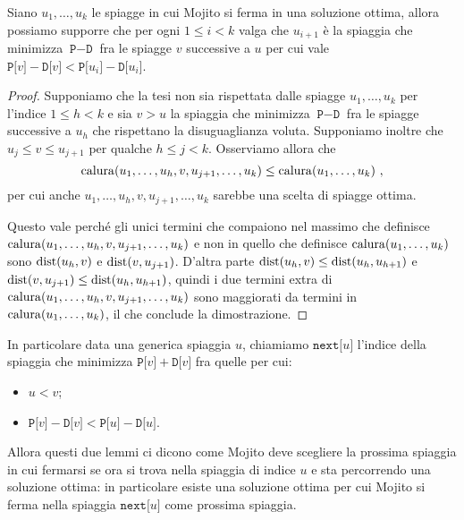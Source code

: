 \begin{lemma}
	Siano $u_1,\ldots,u_k$ le spiagge in cui Mojito si ferma in una soluzione ottima, allora possiamo supporre che per ogni $1\le i <k$ valga che $u_{i+1}$ è la spiaggia che minimizza $\texttt{P}-\texttt{D}$ fra le spiagge $v$ successive a $u$ per cui vale $\texttt{P[}v \texttt{]} - \texttt{D[}v\texttt{]} < \texttt{P[}u_i \texttt{]} - \texttt{D[}u_i\texttt{]}$.
\end{lemma}
\begin{small}
\begin{proof}
	Supponiamo che la tesi non sia rispettata dalle spiagge $u_1,\ldots,u_k$ per l'indice $1 \le h < k$ e sia $v>u$ la spiaggia che minimizza $\texttt{P}-\texttt{D}$ fra le spiagge successive a $u_h$ che rispettano la disuguaglianza voluta. Supponiamo inoltre che $u_j \le v \le u_{j+1}$ per qualche $h\le j <k$.
	Osserviamo allora che
	\begin{equation*}
		\mathrm{calura}(u_1,\ldots, u_h, v, u_{j+1}, \ldots, u_k) \le \mathrm{calura}(u_1, \ldots, u_k) \ ,
	\end{equation*}
	per cui anche $u_1,\ldots, u_h, v, u_{j+1}, \ldots, u_k$ sarebbe una scelta di spiagge ottima.
	
	Questo vale perché gli unici termini che compaiono nel massimo che definisce $\mathrm{calura}(u_1,\ldots, u_h, v, u_{j+1}, \ldots, u_k)$ e non in quello che definisce $\mathrm{calura}(u_1,\ldots,u_k)$ sono $\mathrm{dist}(u_h,v)$ e $\mathrm{dist}(v,u_{j+1})$. D'altra parte $\mathrm{dist}(u_h,v) \le \mathrm{dist}(u_h,u_{h+1})$ e $\mathrm{dist}(v,u_{j+1}) \le \mathrm{dist}(u_h,u_{h+1})$, quindi i due termini extra di $\mathrm{calura}(u_1,\ldots, u_h, v, u_{j+1}, \ldots, u_k)$ sono maggiorati da termini in $\mathrm{calura}(u_1, \ldots, u_k)$, il che conclude la dimostrazione.
\end{proof}
\end{small}

In particolare data una generica spiaggia $u$, chiamiamo $\texttt{next[}u\texttt{]}$ l'indice della spiaggia che minimizza $\texttt{P[}v \texttt{]} + \texttt{D[}v\texttt{]}$ fra quelle per cui:
\begin{itemize}
	 \item $u < v$;
	 \item $\texttt{P[}v \texttt{]} - \texttt{D[}v\texttt{]} < \texttt{P[}u \texttt{]} - \texttt{D[}u\texttt{]}$.
\end{itemize}
Allora questi due lemmi ci dicono come Mojito deve scegliere la prossima spiaggia in cui fermarsi se ora si trova nella spiaggia di indice $u$ e sta percorrendo una soluzione ottima: in particolare esiste una soluzione ottima per cui Mojito si ferma nella spiaggia $\texttt{next[}u\texttt{]}$ come prossima spiaggia.

